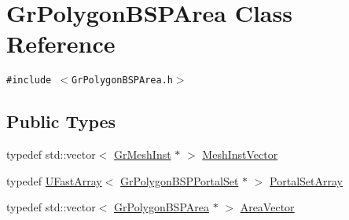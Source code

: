 \hypertarget{class_gr_polygon_b_s_p_area}{
\section{GrPolygonBSPArea Class Reference}
\label{class_gr_polygon_b_s_p_area}
}
{\tt \#include $<$GrPolygonBSPArea.h$>$}

\subsection*{Public Types}
\begin{CompactItemize}
\item 
typedef std::vector$<$ \hyperlink{class_gr_mesh_inst}{GrMeshInst} $\ast$ $>$ \hyperlink{class_gr_polygon_b_s_p_area_b824c31e82278ab2ad80a6401a6e3847}{MeshInstVector}
\item 
typedef \hyperlink{class_u_fast_array}{UFastArray}$<$ \hyperlink{class_gr_polygon_b_s_p_portal_set}{GrPolygonBSPPortalSet} $\ast$ $>$ \hyperlink{class_gr_polygon_b_s_p_area_685afa93a012b1cfa2aba2ed063116b1}{PortalSetArray}
\item 
typedef std::vector$<$ \hyperlink{class_gr_polygon_b_s_p_area}{GrPolygonBSPArea} $\ast$ $>$ \hyperlink{class_gr_polygon_b_s_p_area_38f1607c390fa9072023baccfefd88d1}{AreaVector}
\end{CompactItemize}
